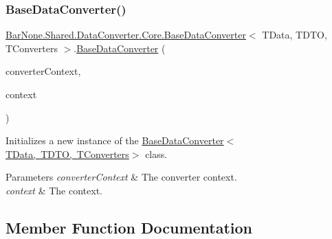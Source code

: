 \subsubsection{\texorpdfstring{Base\+Data\+Converter()}{BaseDataConverter()}}
{\footnotesize\ttfamily \mbox{\hyperlink{class_bar_none_1_1_shared_1_1_data_converter_1_1_core_1_1_base_data_converter}{Bar\+None.\+Shared.\+Data\+Converter.\+Core.\+Base\+Data\+Converter}}$<$ T\+Data, T\+D\+TO, T\+Converters $>$.\mbox{\hyperlink{class_bar_none_1_1_shared_1_1_data_converter_1_1_core_1_1_base_data_converter}{Base\+Data\+Converter}} (\begin{DoxyParamCaption}\item[{T\+Converters}]{converter\+Context,  }\item[{\mbox{\hyperlink{interface_bar_none_1_1_shared_1_1_core_1_1_i_domain_context}{I\+Domain\+Context}}}]{context }\end{DoxyParamCaption})}



Initializes a new instance of the \mbox{\hyperlink{class_bar_none_1_1_shared_1_1_data_converter_1_1_core_1_1_base_data_converter_a8c324ead3d3b0d42f816050dbbd42f36}{Base\+Data\+Converter$<$\+T\+Data, T\+D\+T\+O, T\+Converters$>$}} class. 


\begin{DoxyParams}{Parameters}
{\em converter\+Context} & The converter context.\\
\hline
{\em context} & The context.\\
\hline
\end{DoxyParams}


\subsection{Member Function Documentation}
\mbox{\label{class_bar_none_1_1_shared_1_1_data_converter_1_1_core_1_1_base_data_converter_aebffc229b5b94146a0741030b675cfd7}} 
